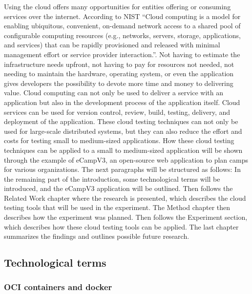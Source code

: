 \documentclass[conference]{IEEEtran}
\begin{document}
Using the cloud offers many opportunities for entities offering or consuming services over the internet.
According to NIST \enquote{Cloud computing is a model for enabling ubiquitous, convenient, on-demand network access to a shared
	pool of configurable computing resources (e.g., networks, servers, storage, applications, and services) that
	can be rapidly provisioned and released with minimal management effort or service provider interaction.}\cite{mell2011nist}.
Not having to estimate the infrastructure needs upfront, not having to pay for resources not needed, not needing to maintain
the hardware, operating system, or even the application gives developers the possibility to devote more time and money
to delivering value.
Cloud computing can not only be used to deliver a service with an application but also in the development process of
the application itself.
Cloud services can be used for version control, review, build, testing, delivery, and deployment of the application.
These cloud testing techniques can not only be used for large-scale distributed systems, but they can also reduce the
effort and costs for testing small to medium-sized applications.
How these cloud testing techniques can be applied to a small to medium-sized application will be shown through the example
of eCampV3, an open-source web application to plan camps for various organizations.
The next paragraphs will be structured as follows:
In the remaining part of the introduction, some technological terms will be introduced, and the eCampV3 application will be
outlined.
Then follows the Related Work chapter where the research is presented, which describes the cloud testing tools that
will be used in the experiment.
The Method chapter then describes how the experiment was planned.
Then follows the Experiment section, which describes how these cloud testing tools can be applied.
The last chapter summarizes the findings and outlines possible future research.

\subsection{Technological terms}

\subsubsection{OCI containers and docker}
\end{document}

